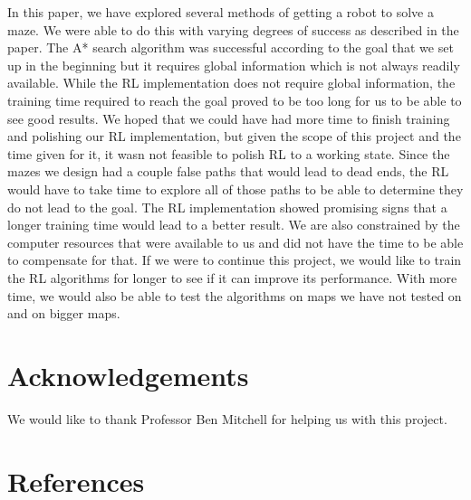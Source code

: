 \documentclass[11pt]{article}
\begin{document}
In this paper, we have explored several methods of getting a robot to solve a
maze. We were able to do this with varying degrees of success as described in
the paper. The A* search algorithm was successful according to the goal that we
set up in the beginning but it requires global information which is not always
readily available. While the RL implementation does not require global
information, the training time required to reach the goal proved to be too long
for us to be able to see good results. We hoped that we could have had more time
to finish training and polishing our RL implementation, but given the scope of
this project and the time given for it, it wasn not feasible to polish RL to a
working state. Since the mazes we design had a couple false paths that would
lead to dead ends, the RL would have to take time to explore all of those paths
to be able to determine they do not lead to the goal. The RL implementation
showed promising signs that a longer training time would lead to a better
result. We are also constrained by the computer resources that were available to
us and did not have the time to be able to compensate for that. If we were to
continue this project, we would like to train the RL algorithms for longer to
see if it can improve its performance. With more time, we would also be able to
test the algorithms on maps we have not tested on and on bigger maps. 

\section{Acknowledgements}


We would like to thank Professor Ben Mitchell for helping us with this project.

\section{References}
\end{document}

